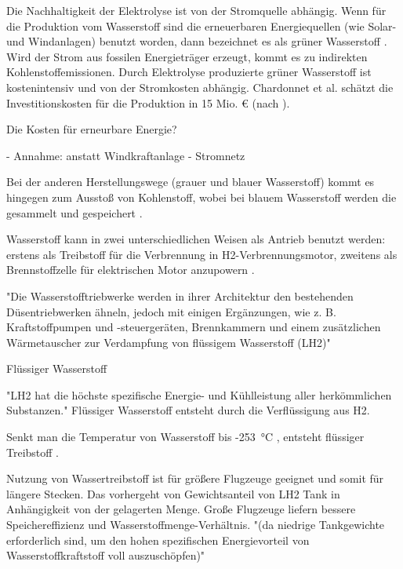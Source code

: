 Die Nachhaltigkeit der Elektrolyse ist von der Stromquelle abhängig. 
Wenn für die Produktion vom Wasserstoff sind die erneuerbaren Energiequellen (wie Solar- und Windanlagen) benutzt worden, 
dann bezeichnet es als grüner Wasserstoff \cite{mulder2019outlook}. Wird der Strom aus fossilen Energieträger erzeugt, kommt es zu indirekten
Kohlenstoffemissionen.
Durch Elektrolyse produzierte grüner Wasserstoff ist kostenintensiv \cite{dalmia2022powering} und von der Stromkosten abhängig. 
Chardonnet et al. schätzt die 
Investitionskosten für die Produktion in 15 Mio. € (nach \cite{mulder2019outlook}).

Die Kosten für erneurbare Energie?

\cite{mulder2019outlook} - Annahme: anstatt Windkraftanlage - Stromnetz

Bei der anderen Herstellungswege (grauer und blauer Wasserstoff)
kommt es hingegen zum Ausstoß von Kohlenstoff, wobei bei blauem Wasserstoff werden die gesammelt und gespeichert \cite{mulder2019outlook}.


Wasserstoff kann in zwei unterschiedlichen Weisen als Antrieb benutzt werden: 
erstens als Treibstoff für die Verbrennung in H2-Verbrennungsmotor,
zweitens als Brennstoffzelle für elektrischen Motor anzupowern \cite{sky2020hydrogen}.

"Die Wasserstofftriebwerke werden in ihrer Architektur den bestehenden Düsentriebwerken ähneln, 
jedoch mit einigen Ergänzungen, wie z. B. Kraftstoffpumpen und -steuergeräten, Brennkammern und
 einem zusätzlichen Wärmetauscher zur Verdampfung von flüssigem Wasserstoff (LH2)" \cite{colpan2022fuel}



Flüssiger Wasserstoff

"LH2 hat die höchste spezifische Energie- und Kühlleistung aller herkömmlichen Substanzen." \cite{ansell2023review}
Flüssiger Wasserstoff entsteht durch die Verflüssigung aus H2.

Senkt man die Temperatur von Wasserstoff bis -253 °C \cite{colpan2022fuel}, entsteht flüssiger Treibstoff .

Nutzung von Wassertreibstoff ist für größere Flugzeuge geeignet und somit für längere Stecken. Das vorhergeht von 
Gewichtsanteil von LH2 Tank in Anhängigkeit von der gelagerten Menge. 
Große Flugzeuge liefern bessere Speichereffizienz und Wasserstoffmenge-Verhältnis.
"(da niedrige Tankgewichte erforderlich sind, um den hohen spezifischen Energievorteil von Wasserstoffkraftstoff voll auszuschöpfen)"
\cite{ansell2023review}



